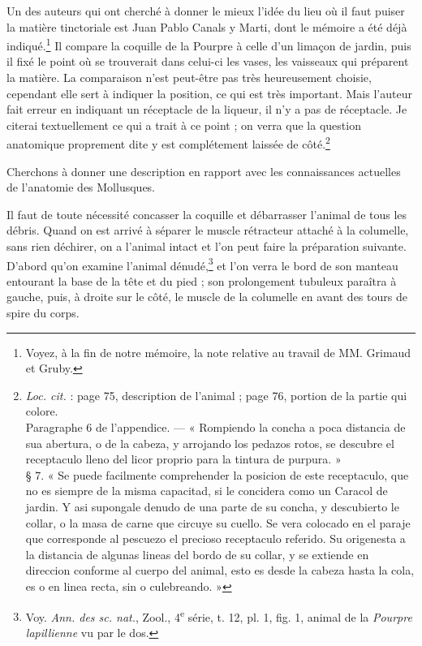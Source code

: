 \documentclass[a4paper, 11pt, oneside, polutonikogreek, french]{article}
\begin{document}
Un des auteurs qui ont cherché à donner le mieux l'idée du lieu où il faut puiser la matière tinctoriale est Juan Pablo Canals y Marti, dont le mémoire a été déjà indiqué.\footnote{Voyez, à la fin de notre mémoire, la note relative au travail de MM. Grimaud et Gruby.} Il compare la coquille de la Pourpre à celle d'un limaçon de jardin, puis il fixé le point où se trouverait dans celui-ci les vases, les vaisseaux qui préparent la matière. La comparaison n'est peut-être pas très heureusement choisie, cependant elle sert à indiquer la position, ce qui est très important. Mais l'auteur fait erreur en indiquant un réceptacle de la liqueur, il n'y a pas de réceptacle. Je citerai textuellement ce qui a trait à ce point ; on verra que la question anatomique proprement dite y est complétement laissée de côté.\footnote{\emph{Loc. cit.} : page 75, description de l'animal ; page 76, portion de la partie qui colore.\\\hspace*{5mm}Paragraphe 6 de l'appendice. --- « Rompiendo la concha a poca distancia de sua abertura, o de la cabeza, y arrojando los pedazos rotos, se descubre el receptaculo lleno del licor proprio para la tintura de purpura. »\\\hspace*{5mm}§ 7. « Se puede facilmente comprehender la posicion de este receptaculo, que no es siempre de la misma capacitad, si le concidera como un Caracol de jardin. Y asi supongale denudo de una parte de su concha, y descubierto le collar, o la masa de carne que circuye su cuello. Se vera colocado en el paraje que corresponde al pescuezo el precioso receptaculo referido. Su origenesta a la distancia de algunas lineas del bordo de su collar, y se extiende en direccion conforme al cuerpo del animal, esto es desde la cabeza hasta la cola, es o en linea recta, sin o culebreando. »}

Cherchons à donner une description en rapport avec les connaissances actuelles de l'anatomie des Mollusques.

Il faut de toute nécessité concasser la coquille et débarrasser l'animal de tous les débris. Quand on est arrivé à séparer le muscle rétracteur attaché à la columelle, sans rien déchirer, on a l'animal intact et l'on peut faire la préparation suivante. D'abord qu'on examine l'animal dénudé,\footnote{Voy. \emph{Ann. des sc. nat.}, Zool., 4\textsuperscript{e} série, t. 12, pl. 1, fig. 1, animal de la \emph{Pourpre lapillienne} vu par le dos.} et l'on verra le bord de son manteau entourant la base de la tête et du pied ; son prolongement tubuleux paraîtra à gauche, puis, à droite sur le côté, le muscle de la columelle en avant des tours de spire du corps.
\end{document}
